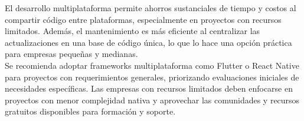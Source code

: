 El desarrollo multiplataforma permite ahorros sustanciales de tiempo y costos al compartir código entre plataformas, especialmente en proyectos con recursos limitados. Además, el mantenimiento es más eficiente al centralizar las actualizaciones en una base de código única, lo que lo hace una opción práctica para empresas pequeñas y medianas.\\

Se recomienda adoptar frameworks multiplataforma como Flutter o React Native para proyectos con requerimientos generales, priorizando evaluaciones iniciales de necesidades específicas. Las empresas con recursos limitados deben enfocarse en proyectos con menor complejidad nativa y aprovechar las comunidades y recursos gratuitos disponibles para formación y soporte.\\